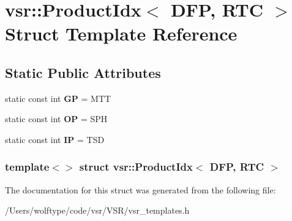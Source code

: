 \hypertarget{structvsr_1_1_product_idx_3_01_d_f_p_00_01_r_t_c_01_4}{\section{vsr\-:\-:Product\-Idx$<$ D\-F\-P, R\-T\-C $>$ Struct Template Reference}
\label{structvsr_1_1_product_idx_3_01_d_f_p_00_01_r_t_c_01_4}
}
\subsection*{Static Public Attributes}
\begin{DoxyCompactItemize}
\item 
\hypertarget{structvsr_1_1_product_idx_3_01_d_f_p_00_01_r_t_c_01_4_a5401c70eaf7ec18783ac9dbbfdcbe9e9}{static const int {\bfseries G\-P} = M\-T\-T}\label{structvsr_1_1_product_idx_3_01_d_f_p_00_01_r_t_c_01_4_a5401c70eaf7ec18783ac9dbbfdcbe9e9}

\item 
\hypertarget{structvsr_1_1_product_idx_3_01_d_f_p_00_01_r_t_c_01_4_a750871fc8e88c3eb2d06a8f8be725735}{static const int {\bfseries O\-P} = S\-P\-H}\label{structvsr_1_1_product_idx_3_01_d_f_p_00_01_r_t_c_01_4_a750871fc8e88c3eb2d06a8f8be725735}

\item 
\hypertarget{structvsr_1_1_product_idx_3_01_d_f_p_00_01_r_t_c_01_4_a68a64a29450bda185bb1b14ac88d87eb}{static const int {\bfseries I\-P} = T\-S\-D}\label{structvsr_1_1_product_idx_3_01_d_f_p_00_01_r_t_c_01_4_a68a64a29450bda185bb1b14ac88d87eb}

\end{DoxyCompactItemize}
\subsubsection*{template$<$$>$ struct vsr\-::\-Product\-Idx$<$ D\-F\-P, R\-T\-C $>$}



The documentation for this struct was generated from the following file\-:\begin{DoxyCompactItemize}
\item 
/\-Users/wolftype/code/vsr/\-V\-S\-R/vsr\-\_\-templates.\-h\end{DoxyCompactItemize}
